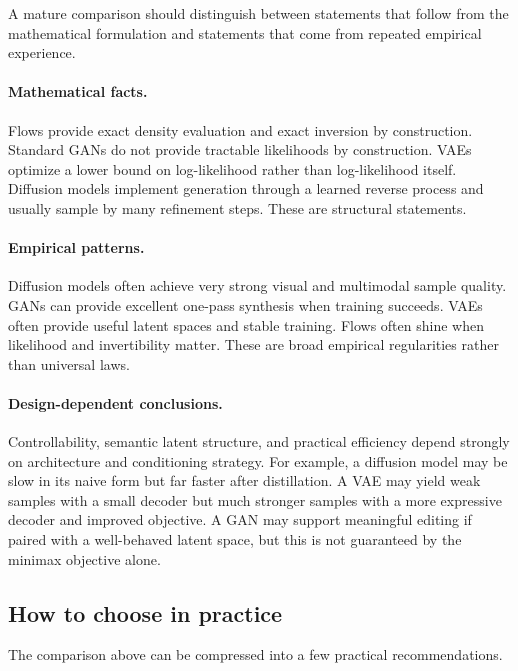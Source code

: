 A mature comparison should distinguish between statements that follow from the mathematical formulation and statements that come from repeated empirical experience.

\paragraph{Mathematical facts.}
Flows provide exact density evaluation and exact inversion by construction.
Standard GANs do not provide tractable likelihoods by construction.
VAEs optimize a lower bound on log-likelihood rather than log-likelihood itself.
Diffusion models implement generation through a learned reverse process and usually sample by many refinement steps.
These are structural statements.

\paragraph{Empirical patterns.}
Diffusion models often achieve very strong visual and multimodal sample quality.
GANs can provide excellent one-pass synthesis when training succeeds.
VAEs often provide useful latent spaces and stable training.
Flows often shine when likelihood and invertibility matter.
These are broad empirical regularities rather than universal laws.

\paragraph{Design-dependent conclusions.}
Controllability, semantic latent structure, and practical efficiency depend strongly on architecture and conditioning strategy.
For example, a diffusion model may be slow in its naive form but far faster after distillation.
A VAE may yield weak samples with a small decoder but much stronger samples with a more expressive decoder and improved objective.
A GAN may support meaningful editing if paired with a well-behaved latent space, but this is not guaranteed by the minimax objective alone.

\subsection*{How to choose in practice}

The comparison above can be compressed into a few practical recommendations.

